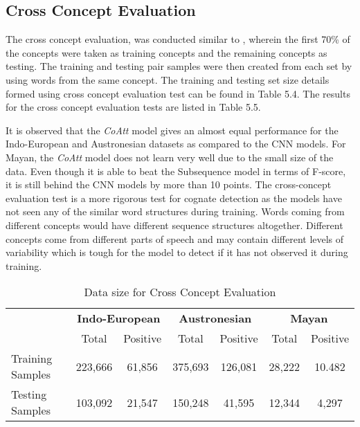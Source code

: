 \clearpage
\subsection{Cross Concept Evaluation}

The cross concept evaluation, was conducted similar to \citep{rama2016siamese}, wherein the first 70\% of the concepts were taken as training concepts and the remaining concepts as testing. The training and testing pair samples were then created from each set by using words from the same concept. The training and testing set size details formed using cross concept evaluation test can be found in Table 5.4. The results for the cross concept evaluation tests are listed in Table 5.5.

It is observed that the \textit{CoAtt} model gives an almost equal performance for the Indo-European and Austronesian datasets as compared to the CNN models. For Mayan, the \textit{CoAtt} model does not learn very well due to the small size of the data. Even though it is able to beat the Subsequence model in terms of F-score, it is still behind the CNN models by more than 10 points. The cross-concept evaluation test is a more rigorous test for cognate detection as the models have not seen any of the similar word structures during training. Words coming from different concepts would have different sequence structures altogether. Different concepts come from different parts of speech and may contain different levels of variability which is tough for the model to detect if it has not observed it during training.

\begin{table*}[t]
\centering
\begin{tabular}{lcccccc}
\multicolumn{1}{c}{\textbf{}} & \multicolumn{2}{c}{\textbf{Indo-European}} & \multicolumn{2}{c}{\textbf{Austronesian}} & \multicolumn{2}{c}{\textbf{Mayan}} \\
\multicolumn{1}{c}{}          & Total               & Positive             & Total               & Positive            & Total           & Positive         \\
Training Samples              & 223,666             & 61,856               & 375,693             & 126,081             & 28,222          & 10.482           \\
Testing Samples               & 103,092             & 21,547               & 150,248             & 41,595              & 12,344          & 4,297           
\end{tabular}
\caption{Data size for Cross Concept Evaluation}
\label{CC_count}
\end{table*}

